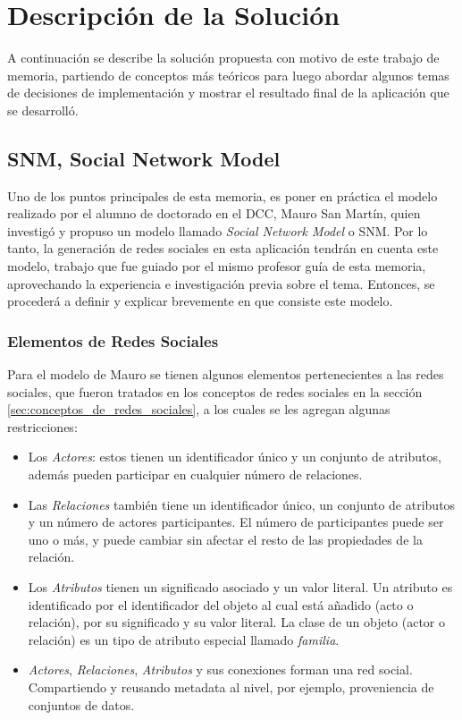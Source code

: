 \chapter{Descripción de la Solución}
\label{chap:descripcion_solucion}

A continuación se describe la solución propuesta con motivo de este trabajo de memoria, partiendo de conceptos más teóricos para luego abordar algunos temas de decisiones de implementación y mostrar el resultado final de la aplicación que se desarrolló.

\section{SNM, Social Network Model} %
\label{sec:snm_social_network_model}

Uno de los puntos principales de esta memoria, es poner en práctica el modelo realizado por el alumno de doctorado en el DCC, Mauro San Martín\cite{tesismauro}, quien investigó y propuso un modelo llamado \emph{Social Network Model} o SNM. Por lo tanto, la generación de redes sociales en esta aplicación tendrán en cuenta este modelo, trabajo que fue guiado por el mismo profesor guía de esta memoria, aprovechando la experiencia e investigación previa sobre el tema. Entonces, se procederá a definir y explicar brevemente en que consiste este modelo.

\subsection{Elementos de Redes Sociales} %
\label{sub:elementos_de_redes_sociales}

Para el modelo de Mauro se tienen algunos elementos pertenecientes a las redes sociales, que fueron tratados en los conceptos de redes sociales en la sección \ref{sec:conceptos_de_redes_sociales}, a los cuales se les agregan algunas restricciones:

  \begin{itemize}
    \item Los \emph{Actores}: estos tienen un identificador único y un conjunto de atributos, además pueden participar en cualquier número de relaciones.
    \item Las \emph{Relaciones} también tiene un identificador único, un conjunto de atributos y un número de actores participantes. El número de participantes puede ser uno o más, y puede cambiar sin afectar el resto de las propiedades de la relación.
    \item Los \emph{Atributos} tienen un significado asociado y un valor literal. Un atributo es identificado por el identificador del objeto al cual está añadido (acto o relación), por su significado y su valor literal. La clase de un objeto (actor o relación) es un tipo de atributo especial llamado \emph{familia}.
    \item \emph{Actores}, \emph{Relaciones}, \emph{Atributos} y sus conexiones forman una red social. Compartiendo y reusando metadata al nivel, por ejemplo, proveniencia de conjuntos de datos.
  \end{itemize}

